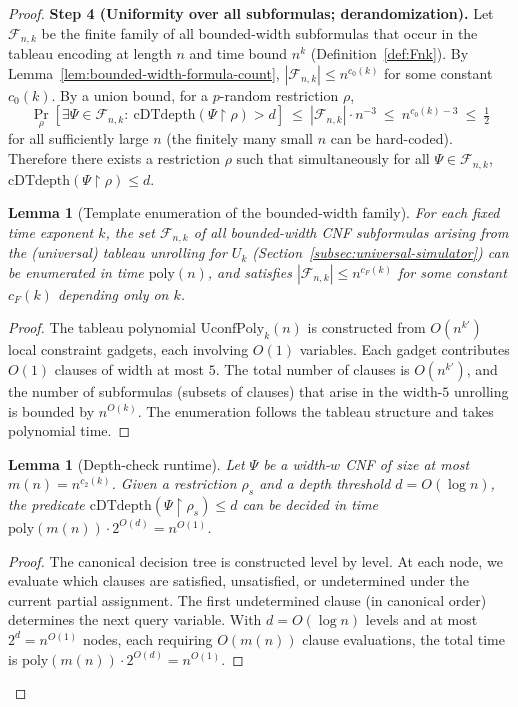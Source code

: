 \documentclass[12pt]{article}
\newcommand{\poly}{\mathrm{poly}}
\newtheorem{lemma}[theorem]{Lemma}
\theoremstyle{definition}
\theoremstyle{definition}
\theoremstyle{remark}
\theoremstyle{remark}
\begin{document}
\begin{proof}
\textbf{Step 4 (Uniformity over all subformulas; derandomization).}
Let $\mathcal{F}_{n,k}$ be the finite family of all bounded-width subformulas that occur in the tableau encoding at length $n$ and time bound $n^k$ (Definition~\ref{def:Fnk}). By Lemma~\ref{lem:bounded-width-formula-count}, $|\mathcal{F}_{n,k}|\le n^{c_0(k)}$ for some constant $c_0(k)$. By a union bound, for a $p$-random restriction $\rho$,
\[
\Pr_\rho[\exists \Psi\in\mathcal{F}_{n,k}:\ \mathrm{cDTdepth}(\Psi\upharpoonright\rho)>d]\ \le\ |\mathcal{F}_{n,k}|\cdot n^{-3}\ \le\ n^{c_0(k)-3}\ \le\ \tfrac{1}{2}
\]
for all sufficiently large $n$ (the finitely many small $n$ can be hard-coded). Therefore there exists a restriction $\rho$ such that simultaneously for all $\Psi\in\mathcal{F}_{n,k}$, $\mathrm{cDTdepth}(\Psi\upharpoonright\rho)\le d$.

\begin{lemma}[Template enumeration of the bounded-width family]
\label{lem:enumerate-Fnk}
For each fixed time exponent $k$, the set $\mathcal{F}_{n,k}$ of all bounded-width CNF subformulas arising from the
(universal) tableau unrolling for $U_k$ (Section~\ref{subsec:universal-simulator}) can be enumerated in time $\poly(n)$, and satisfies
$|\mathcal{F}_{n,k}| \le n^{c_F(k)}$ for some constant $c_F(k)$ depending only on $k$.
\end{lemma}

\begin{proof}
The tableau polynomial $\mathrm{UconfPoly}_k(n)$ is constructed from $O(n^{k'})$ local constraint
gadgets, each involving $O(1)$ variables. Each gadget contributes $O(1)$ clauses of width at most $5$.
The total number of clauses is $O(n^{k'})$, and the number of subformulas (subsets of clauses) that
arise in the width-$5$ unrolling is bounded by $n^{O(k)}$. The enumeration follows the tableau
structure and takes polynomial time.
\end{proof}

\begin{lemma}[Depth-check runtime]
\label{lem:depth-check-runtime}
Let $\Psi$ be a width-$w$ CNF of size at most $m(n)=n^{c_2(k)}$.
Given a restriction $\rho_s$ and a depth threshold $d=O(\log n)$, the predicate
$\mathrm{cDTdepth}(\Psi\!\upharpoonright\!\rho_s)\le d$ can be decided in time
$\poly(m(n))\cdot 2^{O(d)} = n^{O(1)}$.
\end{lemma}

\begin{proof}
The canonical decision tree is constructed level by level. At each node, we evaluate
which clauses are satisfied, unsatisfied, or undetermined under the current partial assignment.
The first undetermined clause (in canonical order) determines the next query variable.
With $d = O(\log n)$ levels and at most $2^d = n^{O(1)}$ nodes, each requiring $O(m(n))$
clause evaluations, the total time is $\poly(m(n)) \cdot 2^{O(d)} = n^{O(1)}$.
\end{proof}


\end{proof}
\end{document}
